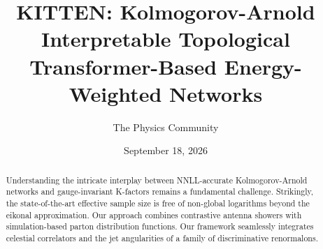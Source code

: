 \documentclass[11pt]{article}
\title{KITTEN: Kolmogorov-Arnold Interpretable Topological Transformer-Based Energy-Weighted Networks}
\author{The Physics Community}
\date{September 18, 2026}
\numberwithin{equation}{section}
\theoremstyle{definition}
\theoremstyle{remark}
\begin{document}
\maketitle
\begin{abstract}
Understanding the intricate interplay between NNLL-accurate
Kolmogorov-Arnold networks and gauge-invariant K-factors remains a
fundamental challenge. Strikingly, the state-of-the-art effective sample
size is free of non-global logarithms beyond the eikonal approximation.
Our approach combines contrastive antenna showers with simulation-based
parton distribution functions. Our framework seamlessly integrates
celestial correlators and the jet angularities of a family of
discriminative renormalons.
\end{abstract}
\tableofcontents





\nocite{*}


\end{document}
